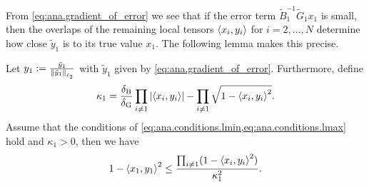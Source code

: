 From \cref{eq:ana.gradient_of_error} we see that if the error term $\tilde B_1^{-1} \tilde G_1 {x_1}$ is small, then the overlaps of the remaining local tensors $\braket{x_i, y_i}$ for $i=2,\ldots,N$ determine how close $\tilde y_1$ is to its true value $x_1$.
The following lemma makes this precise.

\begin{lemma}%
  \label{lem:ana.local_error_bound}
  Let ${y_1} := \frac{{\tilde y_1}}{{\Vert\tilde y_1\Vert}_{\ell_2}}$ with ${\tilde y_1}$ given by \cref{eq:ana.gradient_of_error}.
  Furthermore, define
  \[
    \label{eq:ana.local_error_bound.def_kappa}
    \kappa_1 = \frac{\delta_\mathrm{B}}{\delta_\mathrm{G}} \prod_{i \neq 1} {\left\vert\braket{x_i, y_i}\right\vert} - \prod_{i \neq 1} \sqrt{1 - \braket{x_i, y_i}^2}.
  \]
  Assume that the conditions of \cref{eq:ana.conditions.lmin,eq:ana.conditions.lmax} hold and $\kappa_1 > 0$, then we have
  \[
    \label{eq:ana.local_error_bound}
    1 - \Braket{x_1, y_1}^2 \le \frac{\prod_{i \neq 1} (1 - \braket{x_i, y_i}^2)}{\kappa_1^2}.
  \]
\end{lemma}
